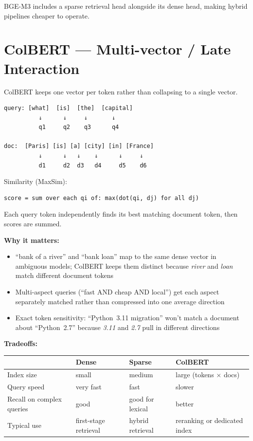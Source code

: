 BGE-M3 includes a sparse retrieval head alongside its dense head, making hybrid pipelines
cheaper to operate.

\section{ColBERT --- Multi-vector / Late Interaction}

ColBERT keeps one vector per token rather than collapsing to a single vector.

\begin{Verbatim}
query: [what]  [is]  [the]  [capital]
          ↓      ↓     ↓       ↓
          q1     q2    q3      q4

doc:  [Paris] [is] [a] [city] [in] [France]
          ↓      ↓   ↓    ↓      ↓     ↓
          d1     d2  d3   d4     d5    d6
\end{Verbatim}

Similarity (MaxSim):

\begin{Verbatim}
score = sum over each qi of: max(dot(qi, dj) for all dj)
\end{Verbatim}

Each query token independently finds its best matching document token, then scores are summed.

\textbf{Why it matters:}

\begin{itemize}
    \item ``bank of a river'' and ``bank loan'' map to the same dense vector in ambiguous
          models; ColBERT keeps them distinct because \textit{river} and \textit{loan} match
          different document tokens
    \item Multi-aspect queries (``fast AND cheap AND local'') get each aspect separately
          matched rather than compressed into one average direction
    \item Exact token sensitivity: ``Python~3.11 migration'' won't match a document about
          ``Python~2.7'' because \textit{3.11} and \textit{2.7} pull in different directions
\end{itemize}

\textbf{Tradeoffs:}

\begin{center}
\begin{tabular}{llll}
\toprule
& \textbf{Dense} & \textbf{Sparse} & \textbf{ColBERT} \\
\midrule
Index size & small & medium & large (tokens $\times$ docs) \\
Query speed & very fast & fast & slower \\
Recall on complex queries & good & good for lexical & better \\
Typical use & first-stage retrieval & hybrid retrieval & reranking or dedicated index \\
\bottomrule
\end{tabular}
\end{center}

